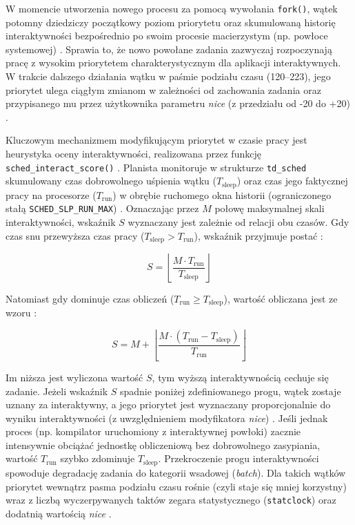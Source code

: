 W momencie utworzenia nowego procesu za pomocą wywołania \texttt{fork()}, wątek potomny dziedziczy początkowy poziom priorytetu oraz skumulowaną historię interaktywności bezpośrednio po swoim procesie macierzystym (np. powłoce systemowej) \cite{roberson2003ule}. Sprawia to, że nowo powołane zadania zazwyczaj rozpoczynają pracę z wysokim priorytetem charakterystycznym dla aplikacji interaktywnych. W trakcie dalszego działania wątku w paśmie podziału czasu (120--223), jego priorytet ulega ciągłym zmianom w zależności od zachowania zadania oraz przypisanego mu przez użytkownika parametru \textit{nice} (z przedziału od -20 do +20) \cite{roberson2003ule, mckusick2014freebsd}.

Kluczowym mechanizmem modyfikującym priorytet w czasie pracy jest heurystyka oceny interaktywności, realizowana przez funkcję \texttt{sched\_interact\_score()} \cite{freebsdSchedUleC}. Planista monitoruje w strukturze \texttt{td\_sched} skumulowany czas dobrowolnego uśpienia wątku ($T_{\text{sleep}}$) oraz czas jego faktycznej pracy na procesorze ($T_{\text{run}}$) w obrębie ruchomego okna historii (ograniczonego stałą \texttt{SCHED\_SLP\_RUN\_MAX}) \cite{roberson2003ule, freebsdSchedUleC}. Oznaczając przez $M$ połowę maksymalnej skali interaktywności, wskaźnik $S$ wyznaczany jest zależnie od relacji obu czasów. Gdy czas snu przewyższa czas pracy ($T_{\text{sleep}} > T_{\text{run}}$), wskaźnik przyjmuje postać \cite{roberson2003ule}:

$$S = \left\lfloor \frac{M \cdot T_{\text{run}}}{T_{\text{sleep}}} \right\rfloor$$

Natomiast gdy dominuje czas obliczeń ($T_{\text{run}} \ge T_{\text{sleep}}$), wartość obliczana jest ze wzoru \cite{roberson2003ule}:

$$S = M + \left\lfloor \frac{M \cdot (T_{\text{run}} - T_{\text{sleep}})}{T_{\text{run}}} \right\rfloor$$

Im niższa jest wyliczona wartość $S$, tym wyższą interaktywnością cechuje się zadanie. Jeżeli wskaźnik $S$ spadnie poniżej zdefiniowanego progu, wątek zostaje uznany za interaktywny, a jego priorytet jest wyznaczany proporcjonalnie do wyniku interaktywności (z uwzględnieniem modyfikatora \textit{nice}) \cite{roberson2003ule}. Jeśli jednak proces (np. kompilator uruchomiony z interaktywnej powłoki) zacznie intensywnie obciążać jednostkę obliczeniową bez dobrowolnego zasypiania, wartość $T_{\text{run}}$ szybko zdominuje $T_{\text{sleep}}$. Przekroczenie progu interaktywności spowoduje degradację zadania do kategorii wsadowej (\textit{batch}). Dla takich wątków priorytet wewnątrz pasma podziału czasu rośnie (czyli staje się mniej korzystny) wraz z liczbą wyczerpywanych taktów zegara statystycznego (\texttt{statclock}) oraz dodatnią wartością \textit{nice} \cite{roberson2003ule, mckusick2014freebsd}.

